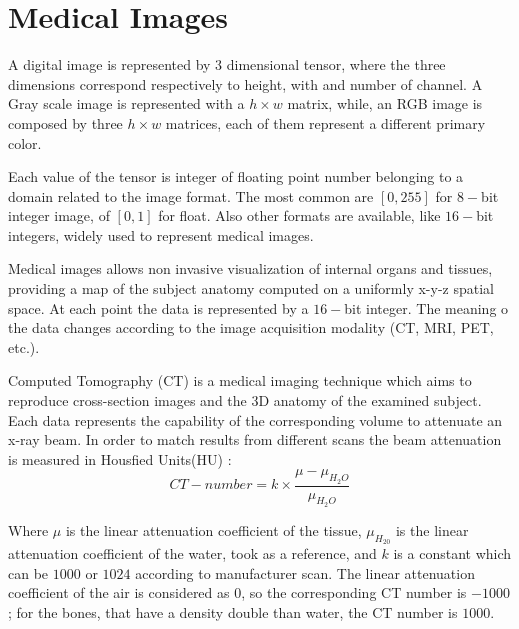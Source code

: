 \documentclass{standalone}
\begin{document}
	\section{Medical Images}
	
	A digital image is represented by 3 dimensional tensor, where the three dimensions correspond respectively to height, with and number of channel. A  Gray scale image is represented with a $h\times w$ matrix, while, an RGB image is composed by three $h\times w$ matrices, each of them represent a different primary color.
	
	Each value of the tensor is integer of floating point number belonging to a domain related to the image format. The most common are $[0, 255]$ for $8-$bit integer image, of $[0, 1]$ for float. Also other formats are available, like $16-$bit integers, widely used to represent medical images.

	Medical images allows non invasive visualization of internal organs and tissues, providing a map of the subject anatomy computed on a uniformly x-y-z spatial space. At each point the data is represented by a $16-$bit integer. The meaning o the data changes according to the image acquisition modality (CT, MRI, PET, etc.).
	
	Computed Tomography (CT) is a medical imaging technique which aims to reproduce  cross-section images and the 3D anatomy of the examined subject. Each data represents the capability  of the corresponding volume to attenuate an x-ray beam. In order to match results from different scans the beam attenuation is measured in Housfied Units(HU) : 
	\begin{equation}\label{eq:HU}
		CT-number = k\times\frac{\mu - \mu_{H_2O}}{\mu_{H_2O}}
	\end{equation}
	
	Where $\mu$ is the linear attenuation coefficient of the tissue, $\mu_{H_20}$ is the linear attenuation coefficient of the water, took as a reference, and $k$ is a constant which can be $1000$ or $1024$ according to manufacturer scan. The linear attenuation coefficient of the air is considered as $0$, so the corresponding CT number is $-1000$; for the bones, that have a density double than water, the CT number is $1000$. 
		
\end{document}
